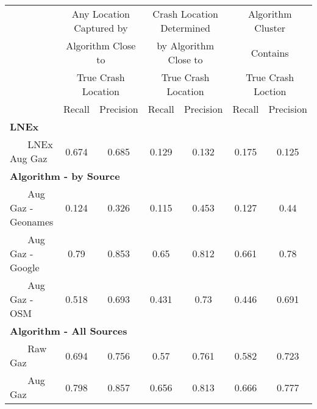 \begin{tabular}{l cc | cc | cc } \hline  & \multicolumn{2}{c|}{Any Location Captured by} & \multicolumn{2}{c|}{Crash Location Determined} & \multicolumn{2}{c}{Algorithm Cluster} \\  & \multicolumn{2}{c|}{Algorithm Close to} & \multicolumn{2}{c|}{by Algorithm Close to}  & \multicolumn{2}{c}{Contains} \\  & \multicolumn{2}{c|}{True Crash Location} & \multicolumn{2}{c|}{True Crash Location}  & \multicolumn{2}{c}{True Crash Loction} \\  \hline  & Recall & Precision & Recall & Precision & Recall & Precision \\ \hline \multicolumn{3}{l|}{\bf LNEx} & & & & \\  ~~~ LNEx Aug Gaz & 0.674  &  0.685  &  0.129  &  0.132  &  0.175  &  0.125  \\ \multicolumn{3}{l|}{\bf Algorithm - by Source} & & & & \\  ~~~ Aug Gaz - Geonames & 0.124  &  0.326  &  0.115  &  0.453  &  0.127  &  0.44  \\  ~~~ Aug Gaz - Google & 0.79  &  0.853  &  0.65  &  0.812  &  0.661  &  0.78  \\  ~~~ Aug Gaz - OSM & 0.518  &  0.693  &  0.431  &  0.73  &  0.446  &  0.691  \\ \multicolumn{3}{l|}{\bf Algorithm - All Sources} & & & & \\  ~~~ Raw Gaz & 0.694  &  0.756  &  0.57  &  0.761  &  0.582  &  0.723  \\  ~~~ Aug Gaz & 0.798  &  0.857  &  0.656  &  0.813  &  0.666  &  0.777  \\ \hline \end{tabular} 